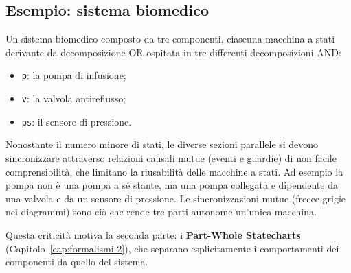 \subsection{Esempio: sistema biomedico}
Un sistema biomedico composto da tre componenti, ciascuna macchina a stati derivante da decomposizione OR ospitata in tre differenti decomposizioni AND:
\begin{itemize}
    \item \texttt{p}: la pompa di infusione;
    \item \texttt{v}: la valvola antireflusso;
    \item \texttt{ps}: il sensore di pressione.
\end{itemize}

\begin{intuition}
Nonostante il numero minore di stati, le diverse sezioni parallele si devono sincronizzare attraverso relazioni causali mutue (eventi e guardie) di non facile comprensibilità, che limitano la riusabilità delle macchine a stati. Ad esempio la pompa non è una pompa a sé stante, ma una pompa collegata e dipendente da una valvola e da un sensore di pressione. Le sincronizzazioni mutue (frecce grigie nei diagrammi) sono ciò che rende tre parti autonome un'unica macchina.
\end{intuition}

Questa criticità motiva la seconda parte: i \textbf{Part-Whole Statecharts} (Capitolo~\ref{cap:formalismi-2}), che separano esplicitamente i comportamenti dei componenti da quello del sistema.
